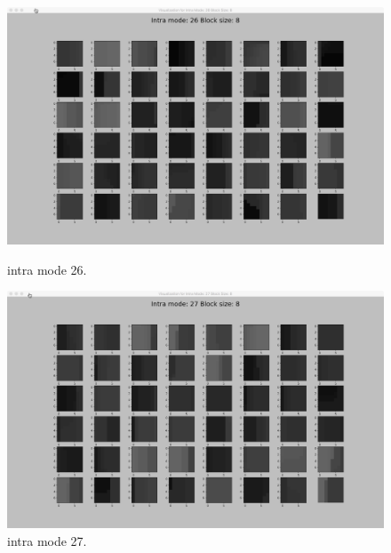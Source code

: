 \begin{figure}[H]
    \begin{minipage}{0.49\textwidth}
        \includegraphics[width=\linewidth]{Figures/visu-size8x8/8-26}
        \caption[Intra mode 26]{intra mode 26.}
        \label{fig:size8_mode26}
    \end{minipage}
    \hspace{\fill} %
    \begin{minipage}{0.49\textwidth}
        \includegraphics[width=\linewidth]{Figures/visu-size8x8/8-27}
        \caption[Intra mode 27]{intra mode 27.}
        \label{fig:size8_mode27}
    \end{minipage}
\end{figure}

